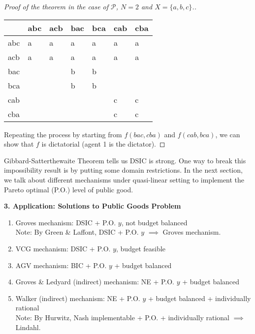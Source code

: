 \documentclass[11pt,leqno]{article}
\begin{document}
\begin{proof}[Proof of the theorem in the case of $\mathcal{P}$, $N=2$ and $X=\{a,b,c\}$.]
\begin{table}[http]
    \centering
    \begin{tabular}{l|l|l|l|l|l|l}
\hline & abc & acb & bac & bca & cab & cba \\
\hline abc &a & a&a &a & a& a\\
\hline acb & a& a& a&a &a & a\\
\hline bac & & & b&b & & \\
\hline bca & & & b& b& & \\
\hline cab & & & & &c &c \\
\hline cba & & & & &c &c \\
\hline
\end{tabular}
\end{table}
Repeating the process by starting from $f(bac,cba)$ and $f(cab,bca)$, we can show that $f$ is dictatorial (agent 1 is the dictator). 
\end{proof}

Gibbard-Satterthewaite Theorem tells us DSIC is strong. One way to break this impossibility result is by putting some domain restrictions. In the next section, we talk about different mechanisms under quasi-linear setting to implement the Pareto optimal (P.O.) level of public good. 

\textbf{3. Application: Solutions to Public Goods Problem}  

\begin{enumerate}
    \item Groves mechanism: DSIC + P.O. $y$, not budget balanced\\
    Note: By Green \& Laffont, DSIC + P.O. $y$ $\implies$ Groves mechanism.
    \item VCG mechanism: DSIC + P.O. $y$, budget feasible
    \item AGV mechanism: BIC + P.O. $y$ + budget balanced 
    \item Groves \& Ledyard (indirect) mechanism: NE + P.O. $y$ + budget balanced
    \item Walker (indirect) mechanism: NE + P.O. $y$ + budget balanced + individually rational\\
    Note: By Hurwitz, Nash implementable + P.O. + individually rational $\implies$ Lindahl.
\end{enumerate}
\end{document}
